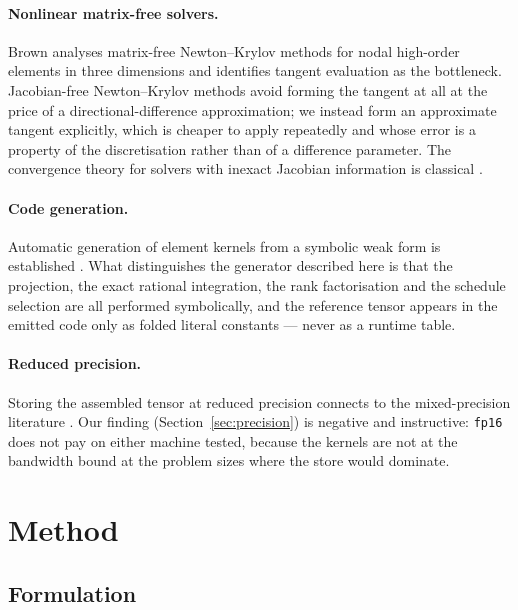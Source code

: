 \documentclass[11pt]{article}
\begin{document}
\paragraph{Nonlinear matrix-free solvers.}  Brown \cite{Brown2010} analyses
matrix-free Newton--Krylov methods for nodal high-order elements in three
dimensions and identifies tangent evaluation as the bottleneck.  Jacobian-free
Newton--Krylov methods \cite{KnollKeyes2004} avoid forming the tangent at all at
the price of a directional-difference approximation; we instead form an
approximate tangent explicitly, which is cheaper to apply repeatedly and whose
error is a property of the discretisation rather than of a difference parameter.
The convergence theory for solvers with inexact Jacobian information is
classical \cite{DemboEisenstatSteihaug1982,EisenstatWalker1996}.

\paragraph{Code generation.}  Automatic generation of element kernels from a
symbolic weak form is established \cite{KirbyLogg2006,UFL2014,Firedrake2016}.
What distinguishes the generator described here is that the projection, the
exact rational integration, the rank factorisation and the schedule selection
are all performed symbolically, and the reference tensor appears in the emitted
code only as folded literal constants --- never as a runtime table.

\paragraph{Reduced precision.}  Storing the assembled tensor at reduced precision
connects to the mixed-precision literature
\cite{HighamMary2022,Abdelfattah2021}.  Our finding
(Section~\ref{sec:precision}) is negative and instructive: \texttt{fp16} does not
pay on either machine tested, because the kernels are not at the bandwidth bound
at the problem sizes where the store would dominate.

\section{Method}
\label{sec:method}

\subsection{Formulation}
\end{document}
